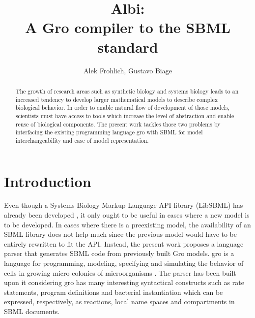 \documentclass[12pt]{article}
\title{Albi:\\ A Gro compiler to the SBML standard}
\author{Alek Frohlich\inst{1}, Gustavo Biage\inst{1}}
\begin{document}
\maketitle

\begin{abstract}


    The growth of research areas such as synthetic biology and systems biology leads to an increased tendency to develop larger mathematical models to describe complex biological behavior. In order to enable natural flow of development of those models, scientists must have access to tools which increase the level of abstraction and enable reuse of biological components. The present work tackles those two problems by interfacing the existing programming language gro with SBML for model interchangeability and ease of model representation.


\end{abstract}

\section{Introduction}

    Even though a Systems Biology Markup Language API library (LibSBML) has already been developed \cite{Bornstein2008}, it only ought to be useful in cases where a new model is to be developed. In cases where there is a preexisting model, the availability of an SBML library does not help much since the previous model would have to be entirely rewritten to fit the API. Instead, the present work proposes a language parser that generates SBML code from previously built Gro models. gro is a language for programming, modeling, specifying and simulating the behavior of cells in growing micro colonies of microorganisms \cite{Jang2012}. The parser has been built upon it considering gro has many interesting syntactical constructs such as rate statements, program definitions and bacterial instantiation which can be expressed, respectively, as reactions, local name spaces and compartments in SBML documents.
    
\end{document}
